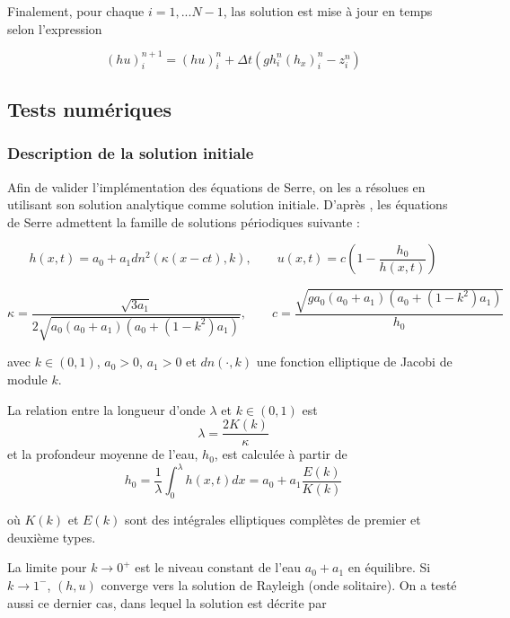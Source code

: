 \indent Finalement, pour chaque $i=1,...N-1$, las solution est mise à jour en temps selon l'expression 

\begin{equation*}
(hu)_i^{n+1} = (hu)_i^n + \Delta t \left(gh_i^n(h_x)_i^n - z_i^n \right)
\end{equation*}

\subsection{Tests numériques}

\subsubsection{Description de la solution initiale}

\indent Afin de valider l'implémentation des équations de Serre, on les a résolues en utilisant son solution analytique comme solution initiale. D'après \cite{CarterCienfuegos2011}, les équations de Serre admettent la famille de solutions périodiques suivante : 

\begin{equation*}
    h(x,t) = a_0 + a_1 dn^2(\kappa(x-ct),k), \qquad
    u(x,t) = c\left( 1 - \frac{h_0}{h(x,t)}\right)
\end{equation*}

\begin{equation*}
    \kappa = \frac{\sqrt{3a_1}}{2\sqrt{a_0(a_0+a_1)(a_0+(1-k^2)a_1)}}, \qquad
    c = \frac{\sqrt{g a_0(a_0+a_1)(a_0+(1-k^2)a_1)}}{h_0}
\end{equation*}

\noindent avec $k\in(0,1)$, $a_0>0$, $a_1>0$ et $dn(\cdot,k)$ une fonction elliptique de Jacobi de module $k$.

\indent La relation entre la longueur d'onde $\lambda$ et $k\in(0,1)$ est $$\lambda = \frac{2K(k)}{\kappa}$$ et la profondeur moyenne de l'eau, $h_0$, est calculée à partir de $$h_0 = \frac{1}{\lambda}\int_{0}^\lambda h(x,t)dx = a_0 + a_1 \frac{E(k)}{K(k)}$$

\noindent où $K(k)$ et $E(k)$ sont des intégrales elliptiques complètes de premier et deuxième types. 

\indent La limite pour $k\to0^+$ est le niveau constant de l'eau $a_0+a_1$ en équilibre. Si $k\to1^-$, $(h,u)$ converge vers la solution de Rayleigh (onde solitaire). On a testé aussi ce dernier cas, dans lequel la solution est décrite par \cite{CarterCienfuegos2011}

